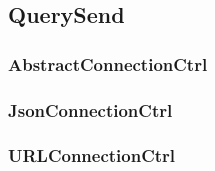 
\subsection{QuerySend}
\subsubsection{AbstractConnectionCtrl}
\subsubsection{JsonConnectionCtrl}
\subsubsection{URLConnectionCtrl}

